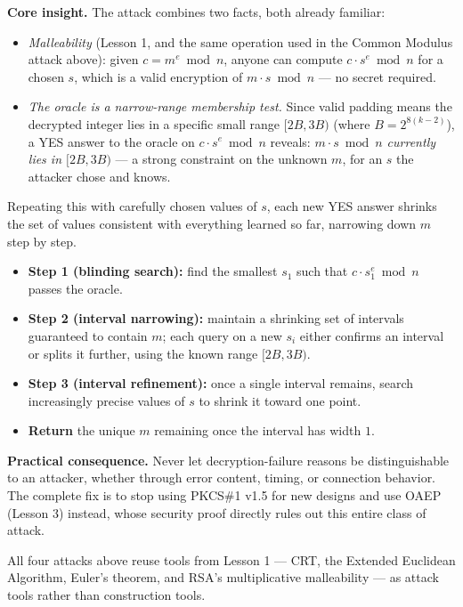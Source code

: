 \documentclass[11pt]{article}
\begin{document}
\textbf{Core insight.} The attack combines two facts, both already familiar:
\begin{itemize}[nosep]
\item \emph{Malleability} (Lesson 1, and the same operation used in the Common Modulus attack above): given $c=m^e\bmod n$, anyone can compute $c\cdot s^e\bmod n$ for a chosen $s$, which is a valid encryption of $m\cdot s\bmod n$ --- no secret required.
\item \emph{The oracle is a narrow-range membership test.} Since valid padding means the decrypted integer lies in a specific small range $[2B,3B)$ (where $B=2^{8(k-2)}$), a YES answer to the oracle on $c\cdot s^e\bmod n$ reveals: \emph{$m\cdot s\bmod n$ currently lies in $[2B,3B)$} --- a strong constraint on the unknown $m$, for an $s$ the attacker chose and knows.
\end{itemize}
Repeating this with carefully chosen values of $s$, each new YES answer shrinks the set of values consistent with everything learned so far, narrowing down $m$ step by step.

\begin{itemize}[nosep]
\item \textbf{Step 1 (blinding search):} find the smallest $s_1$ such that $c\cdot s_1^e\bmod n$ passes the oracle.
\item \textbf{Step 2 (interval narrowing):} maintain a shrinking set of intervals guaranteed to contain $m$; each query on a new $s_i$ either confirms an interval or splits it further, using the known range $[2B,3B)$.
\item \textbf{Step 3 (interval refinement):} once a single interval remains, search increasingly precise values of $s$ to shrink it toward one point.
\item \textbf{Return} the unique $m$ remaining once the interval has width $1$.
\end{itemize}

\textbf{Practical consequence.} Never let decryption-failure reasons be distinguishable to an attacker, whether through error content, timing, or connection behavior. The complete fix is to stop using PKCS\#1 v1.5 for new designs and use OAEP (Lesson 3) instead, whose security proof directly rules out this entire class of attack.

\hrulefill

All four attacks above reuse tools from Lesson 1 --- CRT, the Extended Euclidean Algorithm, Euler's theorem, and RSA's multiplicative malleability --- as attack tools rather than construction tools.
\end{document}

